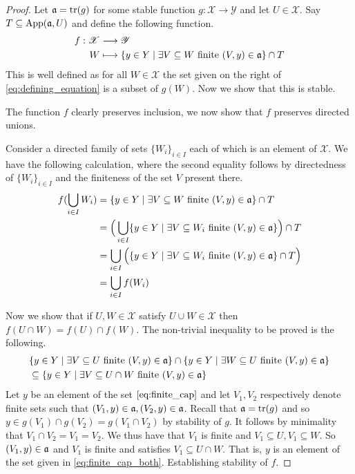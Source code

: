 \documentclass[12pt]{article}
\theoremstyle{plain}
\theoremstyle{definition}
\newcommand{\scr}[1]{\mathscr{#1}}
\newcommand{\lto}{\longrightarrow}
\begin{document}
	\begin{proof}
		Let $\frak{a} = \operatorname{tr}(g)$ for some stable function $g: \scr{X} \lto \scr{Y}$ and let $U \in \scr{X}$. Say $T \subseteq \operatorname{App}(\frak{a}, U)$ and define the following function.
		\begin{align}
			f: \scr{X} &\lto \scr{Y}\\
			\label{eq:defining_equation}W &\longmapsto \{ y \in Y \mid \exists V \subseteq W\text{ finite } (V,y) \in \frak{a} \} \cap T
			\end{align}
		This is well defined as for all $W \in \scr{X}$ the set given on the right of \eqref{eq:defining_equation} is a subset of $g(W)$. Now we show that this is stable.
		
		The function $f$ clearly preserves inclusion, we now show that $f$ preserves directed unions.
		
		Consider a directed family of sets $\{ W_i \}_{i \in I}$ each of which is an element of $\scr{X}$. We have the following calculation, where the second equality follows by directedness of $\{ W_i \}_{i\in I}$ and the finiteness of the set $V$ present there.
		\begin{align*}
			f(\bigcup_{i \in I}W_i) &= \{ y \in Y \mid \exists V \subseteq W\text{ finite }(V, y) \in \frak{a} \} \cap T\\
			&= \Big(\bigcup_{i \in I} \{ y \in Y \mid \exists V \subseteq W_i \text{ finite }(V,y) \in \frak{a} \}\Big) \cap T\\
			&= \bigcup_{i \in I}\Big( \{ y \in Y \mid \exists V \subseteq W_i \text{ finite }(V,y) \in \frak{a} \} \cap T\Big)\\
			&= \bigcup_{i \in I}f(W_i)
			\end{align*}
		
		Now we show that if $U,W \in \scr{X}$ satisfy $U \cup W \in \scr{X}$ then $f(U \cap W) = f(U) \cap f(W)$. The non-trivial inequality to be proved is the following.
		\begin{align}
			\label{eq:finite_cap}&\{ y \in Y \mid \exists V \subseteq U\text{ finite }(V,y) \in \frak{a} \} \cap  \{ y \in Y \mid \exists W \subseteq U\text{ finite }(V,y) \in \frak{a} \} \\
			\label{eq:finite_cap_both}&\subseteq \{ y \in Y \mid \exists V \subseteq U \cap W\text{ finite }(V,y) \in \frak{a} \}
			\end{align}
		Let $y$ be an element of the set $\eqref{eq:finite_cap}$ and let $V_1,V_2$ respectively denote finite sets such that $(V_1,y) \in \frak{a}, (V_2, y) \in \frak{a}$. Recall that $\frak{a} = \operatorname{tr}(g)$ and so $y \in g(V_1) \cap g(V_2) = g(V_1 \cap V_2)$ by stability of $g$. It follows by minimality that $V_1 \cap V_2 = V_1 = V_2$. We thus have that $V_1$ is finite and $V_1 \subseteq U, V_1 \subseteq W$. So $(V_1,y) \in \frak{a}$ and $V_1$ is finite and satisfies $V_1 \subseteq U \cap W$. That is, $y$ is an element of the set given in \eqref{eq:finite_cap_both}. Establishing stability of $f$.
		

\end{proof}
\end{document}
